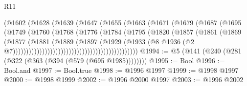 \begin{lexlean}{R11}
\begin{coremodule}
                                          (@1602
                                            (@1628
                                              (@1639
                                                (@1647
                                                  (@1655
                                                    (@1663
                                                      (@1671
                                                        (@1679
                                                          (@1687
                                                            (@1695
                                                              (@1749
                                                                (@1760
                                                                  (@1768
                                                                    (@1776
                                                                      (@1784
                                                                        (@1795
                                                                          (@1820
                                                                            (@1857
                                                                              (@1861
                                                                                (@1869
                                                                                  (@1877
                                                                                    (@1881
                                                                                      (@1889
                                                                                        (@1897
                                                                                          (@1929
                                                                                            (@1933
                                                                                              (@8
                                                                                                @1936
                                                                                                (@2
                                                                                                  @7)))))))))))))))))))))))))))))))))))))))))))))))
@1994 := @5 (@141 (@240 (@281 (@322 (@363 (@394 (@579 (@695 @1985))))))))
@1995 := Bool
@1996 := Bool.and
@1997 := Bool.true
@1998 := @1996 @1997
@1999 := @1998 @1997
@2000 := @1998 @1999
@2002 := @1996 @2000 @1997
@2003 := @1996 @2002

\end{coremodule}
\end{lexlean}
